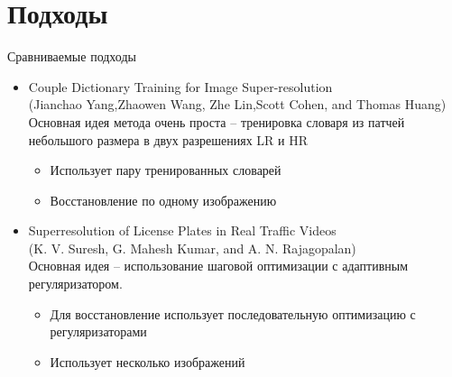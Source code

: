 \section{Подходы}
\begin{frame}{Сравниваемые подходы}
  \begin{itemize}
    \item Couple Dictionary Training for Image Super-resolution \\
        (Jianchao Yang,Zhaowen Wang, Zhe Lin,Scott Cohen, and Thomas Huang) \\
  Основная идея метода очень проста -- тренировка словаря из патчей небольшого размера в двух разрешениях LR и HR
      \begin{itemize}
        \item Использует пару тренированных словарей
        \item Восстановление по одному изображению
      \end{itemize}
    \item Superresolution of License Plates in Real Traffic Videos \\
      (K. V. Suresh, G. Mahesh Kumar, and A. N. Rajagopalan) \\
      Основная идея -- использование шаговой оптимизации с адаптивным регуляризатором.
      \begin{itemize}
        \item Для восстановление использует последовательную оптимизацию с
          регуляризаторами
        \item Использует несколько изображений
      \end{itemize}
  \end{itemize}
\end{frame}


%
%
%

